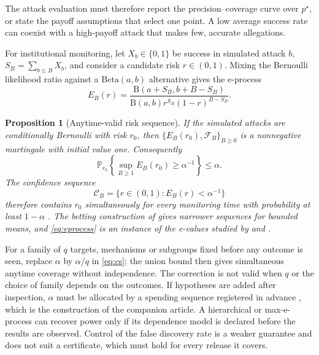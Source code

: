 \documentclass[11pt,a4paper]{article}
\theoremstyle{plain}
\newtheorem{proposition}{Proposition}
\theoremstyle{definition}
\newcommand{\Prob}{\mathbb{P}}
\begin{document}
The attack evaluation must therefore report the precision--coverage curve over
$p^\star$, or state the payoff assumptions that select one point. A low average
success rate can coexist with a high-payoff attack that makes few, accurate
allegations.

For institutional monitoring, let $X_b\in\{0,1\}$ be success in simulated attack
$b$, $S_B=\sum_{b\le B}X_b$, and consider a candidate risk $r\in(0,1)$. Mixing
the Bernoulli likelihood ratio against a $\mathrm{Beta}(a,b)$ alternative gives
the e-process
\begin{equation}
E_B(r)=
\frac{\mathrm B(a+S_B,b+B-S_B)}{\mathrm B(a,b)
r^{S_B}(1-r)^{B-S_B}}.
\label{eq:eprocess}
\end{equation}

\begin{proposition}[Anytime-valid risk sequence]\label{prop:anytime}
If the simulated attacks are conditionally Bernoulli with risk $r_0$, then
$\{E_B(r_0),\mathcal F_B\}_{B\ge0}$ is a nonnegative martingale with initial
value one. Consequently
\begin{equation}
\Prob_{r_0}\!\left\{\sup_{B\ge1}E_B(r_0)\ge\alpha^{-1}\right\}\le\alpha.
\label{eq:ville}
\end{equation}
The confidence sequence
\begin{equation}
\mathcal C_B=\{r\in(0,1):E_B(r)<\alpha^{-1}\}
\label{eq:cs}
\end{equation}
therefore contains $r_0$ simultaneously for every monitoring time with
probability at least $1-\alpha$ \citep{ville1939,howard2020,howard2021}. The
betting construction of \citet{waudbysmith2024} gives narrower sequences for
bounded means, and \eqref{eq:eprocess} is an instance of the e-values studied
by \citet{vovk2021} and \citet{grunwald2024}.
\end{proposition}

For a family of $q$ targets, mechanisms or subgroups fixed before any outcome
is seen, replace $\alpha$ by $\alpha/q$ in \eqref{eq:cs}; the union bound then
gives simultaneous anytime coverage without independence. The correction is not
valid when $q$ or the choice of family depends on the outcomes. If hypotheses
are added after inspection, $\alpha$ must be allocated by a spending sequence
registered in advance \citep{foster2008,tian2021}, which is the construction of the
companion article. A
hierarchical or max-e-process can recover power only if its dependence model is
declared before the results are observed. Control of the false discovery rate
\citep{benjamini1995} is a weaker guarantee and does not suit a certificate,
which must hold for every release it covers.
\end{document}
